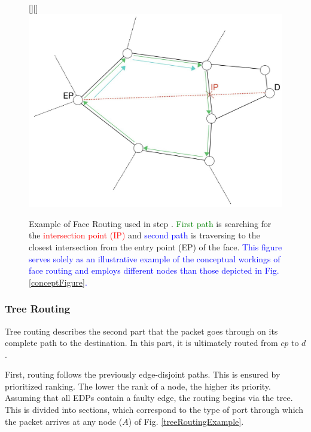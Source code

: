 \documentclass[conference]{IEEEtran}
\begin{document}
\begin{figure}[t]
    \centering
    \raisebox{0pt}[\height][\depth]{\hspace*{-1cm}\includegraphics[scale=0.19]{figures/faceroutingExample.jpg}}
    \caption{Example of Face Routing used in step . \textcolor{green}{First path} is searching for the \textcolor{red}{intersection point (IP)} and \textcolor{blue}{second path} is traversing to the closest intersection from the entry point (EP) of the face. \textcolor{blue}{This figure serves solely as an illustrative example of the conceptual workings of face routing and employs different nodes than those depicted in Fig. \ref{conceptFigure}.}}

    \label{faceRoutingExample}
\end{figure}

\subsubsection{Tree Routing}
\label{routingTree}
Tree routing describes the second part that the packet goes through on its complete path to the destination. In this part, it is ultimately routed from $cp$ to $d$.

First, routing follows the previously edge-disjoint paths. This is ensured by prioritized ranking.
The lower the rank of a node, the higher its priority.
Assuming that all EDPs contain a faulty edge, the routing begins via the tree. This is divided into sections, which correspond to the type of port through which the packet arrives at any node ($A$) of Fig. \ref{treeRoutingExample}.
\end{document}
